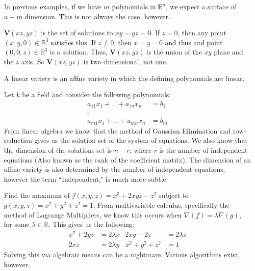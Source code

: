 \documentclass[crop=false,class=article,oneside]{standalone}
\begin{document}
            In previous examples, if we have $m$ polynomials
            in $\mathbb{R}^n$, we expect a surface of $n-m$
            dimension. This is not always the case, however.
            \begin{example}
                $\mathbf{V}(xz,yz)$ is the set of solutions
                to $xy=yz=0$. If $z=0$, then any point
                $(x,y,0)\in \mathbb{R}^3$ satisfies this.
                If $z\ne 0$, then $x=y=0$ and thus and point
                $(0,0,z)\in \mathbb{R}^3$ is a solution.
                Thus, $\mathbf{V}(xz,yz)$ is the union of the $xy$
                plane and the $z$ axis. So $\mathbf{V}(xz,yz)$
                is two dimensional, not one.
            \end{example}
            \begin{definition}
                A linear variety is an affine variety
                in which the defining polynomials are linear.
            \end{definition}
            \begin{example}
                Let $k$ be a field and consider
                the following polynomials:
                \begin{align*}
                    a_{11}x_{1}+\hdots+a_{1n}x_{n}
                    &=b_{1}\\
                    \vdots&\\
                    a_{m1}x_{1}+\hdots+a_{mn}x_{n}
                    &=b_{m}
                \end{align*}
                From linear algebra we know that the
                method of Gaussian Elimination and
                row-reduction gives us the solution set of the
                system of equations. We also know that the
                dimension of the solutions set is $n-r$, where $r$
                is the number of independent equations
                (Also known as the rank of the coefficient matrix).
                The dimension of an affine variety is also
                determined by the number of independent equations,
                however the term ``Independent," is much more subtle.
            \end{example}
            \begin{example}
                Find the maximum of $f(x,y,z)=x^{3}+2xyz-z^{2}$
                subject to $g(x,y,z) = x^2+y^2+z^2=1$.
                From multivariable calculus, specifically
                the method of Lagrange Multipliers, we know
                this occurs when $\nabla(f)=\lambda\nabla(g)$,
                for some $\lambda\in\mathbb{R}$.
                This gives us the following:
                \begin{align*}
                    x^{2}+2yz
                    &=2\lambda{x}&2xy-2z
                    &=2\lambda{z}\\
                    2xz
                    &=2\lambda{y}&x^{2}+y^{2}+z^2
                    &=1
                \end{align*}
                Solving this via algebraic means can
                be a nightmare.
                Various algorithms exist, however.
            \end{example}
\end{document}
